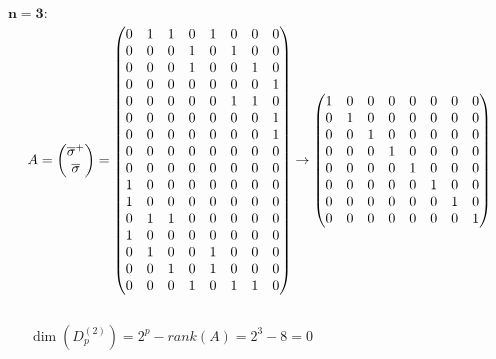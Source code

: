 \noindent$\mathbf{n = 3:}$
{\footnotesize
	\[
	A =
	\begin{pmatrix}
		\overline{\sigma}^{+}\\
		\overline{\sigma}
	\end{pmatrix}=
	\begin{pmatrix}
		0 & 1 & 1 & 0 & 1 & 0 & 0 & 0\\
		0 & 0 & 0 & 1 & 0 & 1 & 0 & 0\\
		0 & 0 & 0 & 1 & 0 & 0 & 1 & 0\\
		0 & 0 & 0 & 0 & 0 & 0 & 0 & 1\\
		0 & 0 & 0 & 0 & 0 & 1 & 1 & 0\\
		0 & 0 & 0 & 0 & 0 & 0 & 0 & 1\\
		0 & 0 & 0 & 0 & 0 & 0 & 0 & 1\\
		0 & 0 & 0 & 0 & 0 & 0 & 0 & 0\\
		0 & 0 & 0 & 0 & 0 & 0 & 0 & 0\\
		1 & 0 & 0 & 0 & 0 & 0 & 0 & 0\\
		1 & 0 & 0 & 0 & 0 & 0 & 0 & 0\\
		0 & 1 & 1 & 0 & 0 & 0 & 0 & 0\\
		1 & 0 & 0 & 0 & 0 & 0 & 0 & 0\\
		0 & 1 & 0 & 0 & 1 & 0 & 0 & 0\\
		0 & 0 & 1 & 0 & 1 & 0 & 0 & 0\\
		0 & 0 & 0 & 1 & 0 & 1 & 1 & 0\\
	\end{pmatrix}\rightarrow
	\begin{pmatrix}
		1 & 0 & 0 & 0 & 0 & 0 & 0 & 0\\
		0 & 1 & 0 & 0 & 0 & 0 & 0 & 0\\
		0 & 0 & 1 & 0 & 0 & 0 & 0 & 0\\
		0 & 0 & 0 & 1 & 0 & 0 & 0 & 0\\
		0 & 0 & 0 & 0 & 1 & 0 & 0 & 0\\
		0 & 0 & 0 & 0 & 0 & 1 & 0 & 0\\
		0 & 0 & 0 & 0 & 0 & 0 & 1 & 0\\
		0 & 0 & 0 & 0 & 0 & 0 & 0 & 1\\
	\end{pmatrix}
	\]
}
\
\\[12pt]

\noindent\qquad~~~$\dim(D^{(2)}_p) = 2^{p} - rank(A) = 2^{3} - 8 = 0$\\

